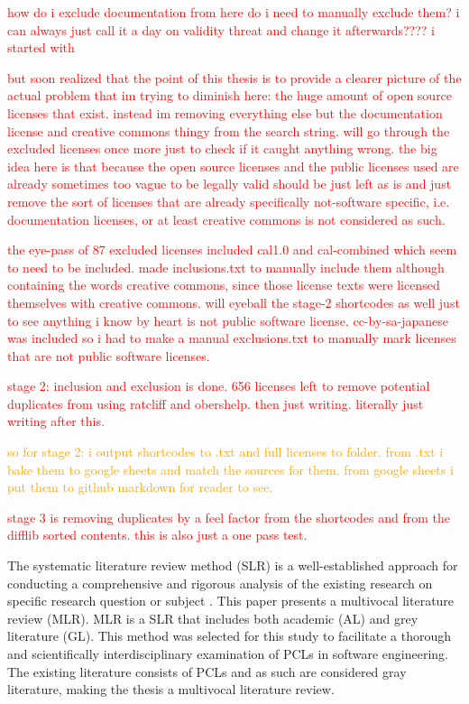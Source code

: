 \textcolor{red}{how do i exclude documentation from here do i need to manually exclude them? i can always just call it a day on validity threat and change it afterwards???? i started with}

\textcolor{red}{but soon realized that the point of this thesis is to provide a clearer picture of the actual problem that im trying to diminish here: the huge amount of open source licenses that exist. instead im removing everything else but the documentation license and creative commons thingy from the search string. will go through the excluded licenses once more just to check if it caught anything wrong. the big idea here is that because the open source licenses and the public licenses used are already sometimes too vague to be legally valid should be just left as is and just remove the sort of licenses that are already specifically not-software specific, i.e. documentation licenses, or at least creative commons is not considered as such.}

\textcolor{red}{the eye-pass of 87 excluded licenses included cal1.0 and cal-combined which seem to need to be included. made inclusions.txt to manually include them although containing the words creative commons, since those license texts were licensed themselves with creative commons. will eyeball the stage-2 shortcodes as well just to see anything i know by heart is not public software license. cc-by-sa-japanese was included so i had to make a manual exclusions.txt to manually mark licenses that are not public software licenses.}

\textcolor{red}{stage 2: inclusion and exclusion is done. 656 licenses left to remove potential duplicates from using ratcliff and obershelp. then just writing. literally just writing after this.}

\textcolor{orange}{so for stage 2: i output shortcodes to .txt and full licenses to folder. from .txt i bake them to google sheets and match the sources for them. from google sheets i put them to github markdown for reader to see.}

\textcolor{red}{stage 3 is removing duplicates by a feel factor from the shortcodes and from the difflib sorted contents. this is also just a one pass test.}

The systematic literature review method (SLR) is a well-established approach for conducting a comprehensive and rigorous analysis of the existing research on specific research question or subject \citep{kitchenham2007}. This paper presents a multivocal literature review (MLR). MLR is a SLR that includes both academic (AL) and grey literature (GL). This method was selected for this study to facilitate a thorough and scientifically interdisciplinary examination of PCLs in software engineering. The existing literature consists of PCLs and as such are considered gray literature, making the thesis a multivocal literature review.

